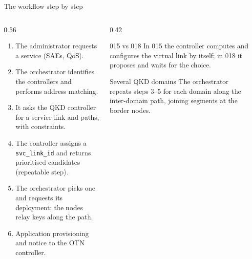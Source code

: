 \documentclass[10pt]{beamer}
\begin{document}
\begin{frame}{The workflow step by step}
  \begin{columns}[T]
    \begin{column}{0.56\textwidth}
      \begin{enumerate}\small
        \item The administrator requests a service (SAEs, QoS).
        \item The orchestrator identifies the controllers and performs
              address matching.
        \item It asks the QKD controller for a service link and paths,
              with constraints.
        \item The controller assigns a \texttt{svc\_link\_id} and returns
              prioritised candidates (repeatable step).
        \item The orchestrator picks one and requests its deployment; the
              nodes relay keys along the path.
        \item Application provisioning and notice to the OTN controller.
      \end{enumerate}
    \end{column}
    \begin{column}{0.42\textwidth}
      \begin{block}{015 vs 018}
        \small In 015 the controller computes and configures the virtual
        link by itself; in 018 it \alert{proposes} and waits for the choice.
      \end{block}
      \begin{block}{Several QKD domains}
        \small The orchestrator repeats steps 3–5 for each domain along the
        inter-domain path, joining segments at the border nodes.
      \end{block}
    \end{column}
  \end{columns}
\end{frame}
\end{document}

